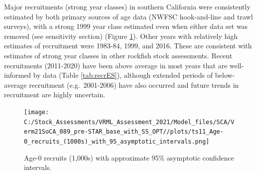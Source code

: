 \documentclass[11pt,
  english,
  a4paper,
]{article}
\begin{document}
\leavevmode\tagmcend\tagstructend

Major recruitments (strong year classes) in southern California were consistently estimated by both primary sources of age data (NWFSC hook-and-line and trawl surveys), with a strong 1999 year class estimated even when either data set was removed (see sensitivity section) (Figure \ref{fig:recruitsES}). Other years with relatively high estimates of recruitment were 1983-84, 1999, and 2016. These are consistent with estimates of strong year classes in other rockfish stock assessments. Recent recruitments (2011-2020) have been above average in most years that are well-informed by data (Table \ref{tab:recrES}), although extended periods of below-average recruitment (e.g.~2001-2006) have also occurred and future trends in recruitment are highly uncertain.

\begin{figure}
\centering
\texttt{[image: C:/Stock\_Assessments/VRML\_Assessment\_2021/Model\_files/SCA/Verm21SoCA\_089\_pre-STAR\_base\_with\_SS\_OPT//plots/ts11\_Age-0\_recruits\_(1000s)\_with\_95\_asymptotic\_intervals.png]}
\caption{Age-0 recruits (1,000s) with approximate 95\% asymptotic confidence intervals.\label{fig:recruitsES}}
\end{figure}
\end{document}
